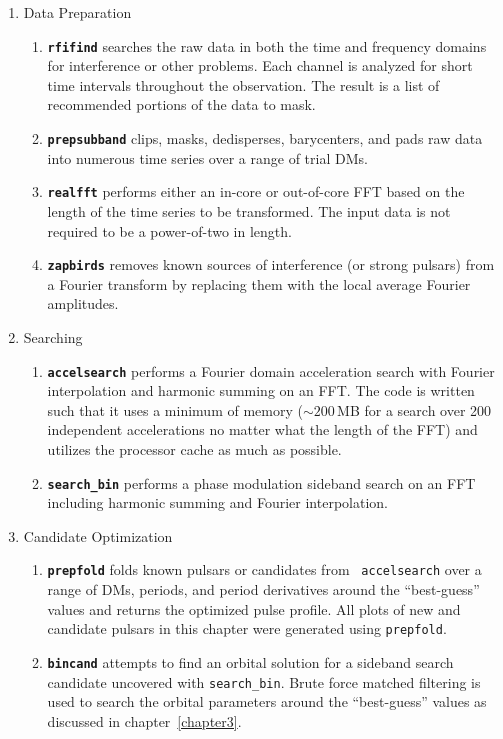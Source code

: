 \documentclass[11pt]{article}
\begin{document}
\begin{enumerate}
\item Data Preparation
  \begin{enumerate}
  \item {\bf\tt rfifind} searches the raw data in both the time and
    frequency domains for interference or other problems.  Each
    channel is analyzed for short time intervals throughout the
    observation.  The result is a list of recommended portions of the
    data to mask.
  \item {\bf\tt prepsubband} clips, masks, dedisperses, barycenters,
    and pads raw data into numerous time series over a range of trial
    DMs.
  \item {\bf\tt realfft} performs either an in-core or out-of-core FFT
    based on the length of the time series to be transformed.  The
    input data is not required to be a power-of-two in length.
  \item {\bf\tt zapbirds} removes known sources of interference (or
    strong pulsars) from a Fourier transform by replacing them with
    the local average Fourier amplitudes.
  \end{enumerate}
\item Searching
  \begin{enumerate}
  \item {\bf\tt accelsearch} performs a Fourier domain acceleration
    search with Fourier interpolation and harmonic summing on an FFT.
    The code is written such that it uses a minimum of memory
    ($\sim200$\,MB for a search over 200 independent accelerations no
    matter what the length of the FFT) and utilizes the processor
    cache as much as possible.
  \item {\bf\tt search\_bin} performs a phase modulation sideband
    search on an FFT including harmonic summing and Fourier
    interpolation.
  \end{enumerate}
\item Candidate Optimization
  \begin{enumerate}
  \item {\bf\tt prepfold} folds known pulsars or candidates from {\tt
      accelsearch} over a range of DMs, periods, and period
    derivatives around the ``best-guess'' values and returns the
    optimized pulse profile.  All plots of new and candidate pulsars
    in this chapter were generated using {\tt prepfold}.
  \item {\bf\tt bincand} attempts to find an orbital solution for a
    sideband search candidate uncovered with {\tt search\_bin}.  Brute
    force matched filtering is used to search the orbital parameters
    around the ``best-guess'' values as discussed in
    chapter~\ref{chapter3}.
  \end{enumerate}
\end{enumerate}
\end{document}
